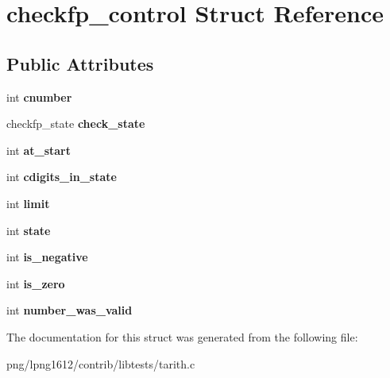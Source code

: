 \hypertarget{structcheckfp__control}{\section{checkfp\+\_\+control Struct Reference}
\label{structcheckfp__control}
}
\subsection*{Public Attributes}
\begin{DoxyCompactItemize}
\item 
\hypertarget{structcheckfp__control_a2410256d06b801d347e632f3f9d4a855}{int {\bfseries cnumber}}\label{structcheckfp__control_a2410256d06b801d347e632f3f9d4a855}

\item 
\hypertarget{structcheckfp__control_a3d82dd4059fcda018164da10d974588d}{checkfp\+\_\+state {\bfseries check\+\_\+state}}\label{structcheckfp__control_a3d82dd4059fcda018164da10d974588d}

\item 
\hypertarget{structcheckfp__control_a8f80fe0b89eb5567379a48b2232e3afb}{int {\bfseries at\+\_\+start}}\label{structcheckfp__control_a8f80fe0b89eb5567379a48b2232e3afb}

\item 
\hypertarget{structcheckfp__control_a4c6b0edb71578db405846c00ef788e7c}{int {\bfseries cdigits\+\_\+in\+\_\+state}}\label{structcheckfp__control_a4c6b0edb71578db405846c00ef788e7c}

\item 
\hypertarget{structcheckfp__control_a0d8e8d79e179a2065382a5244ffc05f0}{int {\bfseries limit}}\label{structcheckfp__control_a0d8e8d79e179a2065382a5244ffc05f0}

\item 
\hypertarget{structcheckfp__control_ac3a476f99cc99fcf44861a041df45a8c}{int {\bfseries state}}\label{structcheckfp__control_ac3a476f99cc99fcf44861a041df45a8c}

\item 
\hypertarget{structcheckfp__control_a3299c0ca205dd3779d0cc1cf46bfa07c}{int {\bfseries is\+\_\+negative}}\label{structcheckfp__control_a3299c0ca205dd3779d0cc1cf46bfa07c}

\item 
\hypertarget{structcheckfp__control_ad4cf3d004568738e91fabe1f2e5723b5}{int {\bfseries is\+\_\+zero}}\label{structcheckfp__control_ad4cf3d004568738e91fabe1f2e5723b5}

\item 
\hypertarget{structcheckfp__control_a08a54e235bfb18207343d1fff828c875}{int {\bfseries number\+\_\+was\+\_\+valid}}\label{structcheckfp__control_a08a54e235bfb18207343d1fff828c875}

\end{DoxyCompactItemize}


The documentation for this struct was generated from the following file\+:\begin{DoxyCompactItemize}
\item 
png/lpng1612/contrib/libtests/tarith.\+c\end{DoxyCompactItemize}
